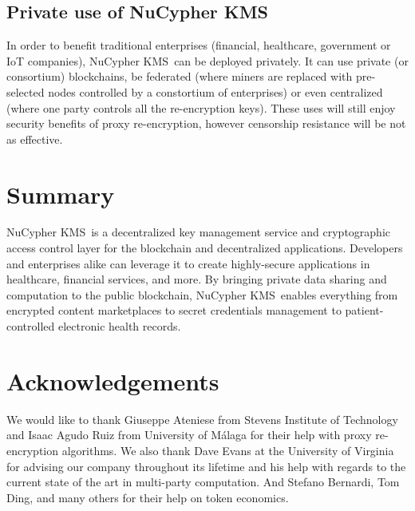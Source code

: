 \documentclass[longbibliography,nofootinbib]{revtex4-1}
\newcommand{\kms}{NuCypher KMS}
\begin{document}
\begin{CJK*}{UTF8}{gbsn}
\subsection{Private use of \kms}
In order to benefit traditional enterprises (financial, healthcare, government or IoT companies), \kms~can be deployed privately.
It can use private (or consortium) blockchains,
be federated (where miners are replaced with pre-selected nodes controlled by a constortium of enterprises)
or even centralized (where one party controls all the re-encryption keys).
These uses will still enjoy security benefits of proxy re-encryption, however censorship resistance will be not as effective.

\section{Summary}
\kms~is a decentralized key management service and cryptographic access control layer for the blockchain and
decentralized applications.
Developers and enterprises alike can leverage it to create highly-secure applications in healthcare,
financial services, and more.
By bringing private data sharing and computation to the public blockchain, \kms~enables everything from encrypted
content marketplaces to secret credentials management to patient-controlled electronic health records.

\section{Acknowledgements}
We would like to thank Giuseppe Ateniese from Stevens Institute of Technology and Isaac Agudo Ruiz from University of M{\'a}laga
for their help with proxy re-encryption algorithms.
We also thank Dave Evans at the University of Virginia for advising our company throughout its lifetime
and his help with regards to the current state of the art in multi-party computation.
And Stefano Bernardi, Tom Ding, and many others for their help on token economics.

\end{CJK*}


\end{document}
